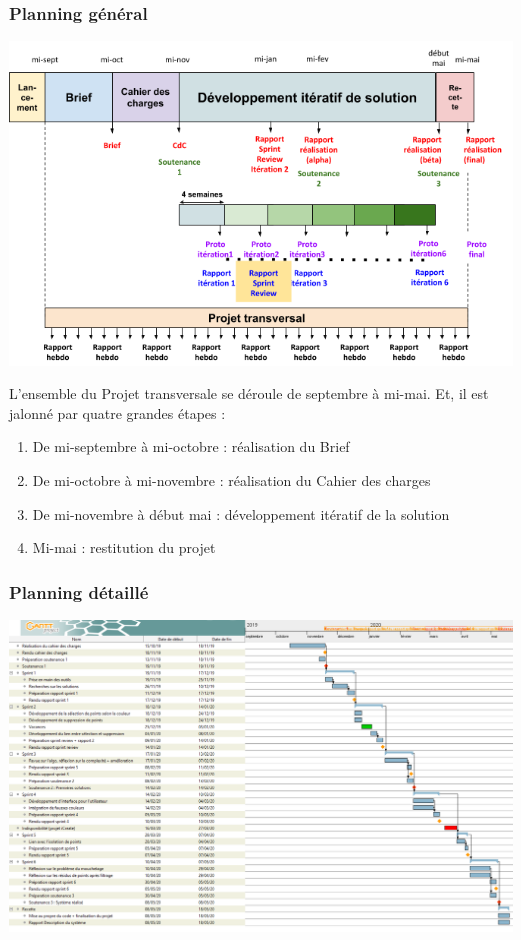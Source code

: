 \documentclass[12pt,titlepage,french]{article}
\begin{document}
\subsubsection*{Planning général}
\begin{center}
\includegraphics[width=\textwidth]{planning.png}
\label{fig:Planning général}
\end{center}
L'ensemble du Projet transversale se déroule de septembre à mi-mai. Et, il est jalonné par quatre grandes étapes : 
\begin{enumerate}
\item De mi-septembre à mi-octobre : réalisation du Brief
\item De mi-octobre à mi-novembre : réalisation du Cahier des charges 
\item De mi-novembre à début mai : développement itératif de la solution
\item Mi-mai : restitution du projet
\end{enumerate}

\subsubsection*{Planning détaillé}

\begin{center}
    \includegraphics[scale=0.6,angle=90,origin=c]{gantt.png}
    \label{fig:Planning détaillé}
\end{center}
\end{document}
